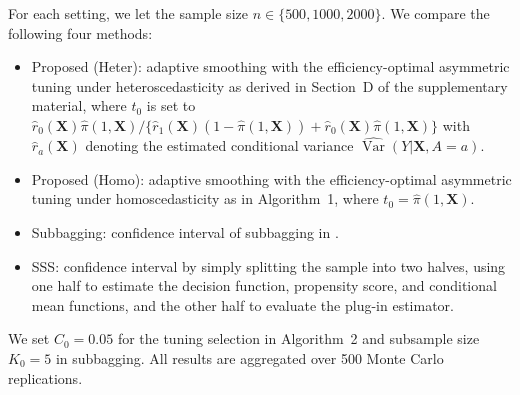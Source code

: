 \documentclass[11pt]{article}
\theoremstyle{referenceplain}
\theoremstyle{referencedefinition}
\theoremstyle{referenceremark}
\begin{document}
For each setting, we let the sample size $n \in \{500, 1000, 2000\}$. We compare the following four methods:
\begin{itemize}
    \item Proposed (Heter): adaptive smoothing with the efficiency-optimal
    asymmetric tuning under heteroscedasticity as derived in Section~D of
    the supplementary material, where $t_0$ is set to
    $\widehat{r}_0(\mathbf{X})\widehat{\pi}(1,\mathbf{X}) /
    \{\widehat{r}_1(\mathbf{X})(1-\widehat{\pi}(1,\mathbf{X})) +
    \widehat{r}_0(\mathbf{X})\widehat{\pi}(1,\mathbf{X})\}$ with
    $\widehat{r}_a(\mathbf{X})$ denoting the estimated conditional
    variance $\widehat{\operatorname{Var}}(Y|\mathbf{X},A=a)$.
    \item Proposed (Homo): adaptive smoothing with the efficiency-optimal
    asymmetric tuning under homoscedasticity as in Algorithm~1, where
    $t_0 = \widehat{\pi}(1,\mathbf{X})$.
    \item Subbagging: confidence interval of subbagging in
    \citet{shi2020breaking}.
    \item SSS: confidence interval by simply splitting the sample into two
    halves, using one half to estimate the decision function, propensity
    score, and conditional mean functions, and the other half to evaluate
    the plug-in estimator.
\end{itemize}
We
set ${C_0} = 0.05$ for the tuning selection in Algorithm~2 and subsample size
$K_0 = 5$ in subbagging. All results are aggregated over 500 Monte Carlo
replications.
\end{document}
